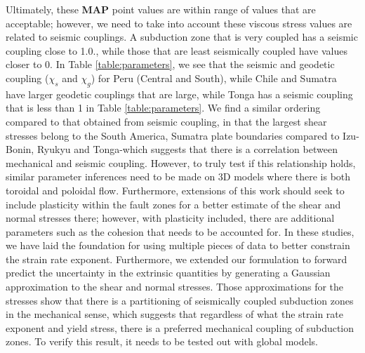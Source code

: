 \documentclass[12pt]{article}
\begin{document}
   Ultimately, these \textbf{MAP} point values are within range of values that are acceptable; however, we need to take into account these viscous stress values are related to seismic couplings. A subduction zone that is very coupled has a seismic coupling close to 1.0., while those that are least seismically coupled have values closer to 0.  In Table \ref{table:parameters}, we see that the seismic and geodetic coupling ($\chi_s$ and $\chi_g$) for Peru (Central and South), while Chile and Sumatra have larger geodetic couplings that are large, while Tonga has a seismic coupling that is less than 1 in Table \ref{table:parameters}. We find a similar ordering compared to that obtained from seismic coupling, in that the largest shear stresses belong to the South America, Sumatra plate boundaries compared to Izu-Bonin, Ryukyu and Tonga-which suggests that there is a correlation between mechanical and seismic coupling. However, to truly test if this relationship holds, similar parameter inferences need to be made on 3D models where there is both toroidal and poloidal flow. Furthermore, extensions of this work should seek to include plasticity within the fault zones for a better estimate of the shear and normal stresses there; however, with plasticity included, there are additional parameters such as the cohesion that needs to be accounted for. In these studies, we have laid the foundation for using multiple pieces of data to better constrain the strain rate exponent. Furthermore, we extended our formulation to forward predict the uncertainty in the extrinsic quantities by generating a Gaussian approximation to the shear and normal stresses. Those approximations for the stresses show that there is a partitioning of seismically coupled subduction zones in the mechanical sense, which suggests that regardless of what the strain rate exponent and  yield stress, there is a preferred mechanical coupling of subduction zones. To verify this result, it needs to be tested out with global models.
                 








\appendix
\end{document}
